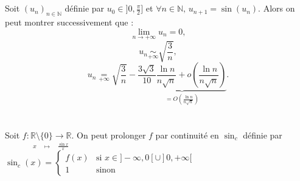 \documentclass[conference]{IEEEtran}
\begin{document}
\section{}
\noindent
Soit $(u_n)_{n\in \mathbb{N}}$ définie par $u_0\in ]0,\frac{\pi}{2}]$ et $\forall n \in \mathbb{N}, \, u_{n+1}=\sin (u_n)$. Alors on peut montrer successivement que : 
\[\lim_{n\rightarrow +\infty} u_n = 0,\]
\[u_n \underset{+\infty}{\sim} \sqrt{\frac{3}{n}},\]
\[u_n \underset{+\infty}{=} \sqrt{\frac{3}{n}}- \underset{= O\left( \frac{\ln n}{n\sqrt{n}} \right)}{\underbrace{\frac{3\sqrt{3}}{10}\frac{\ln n}{n\sqrt{n}}+ o\left( \frac{\ln n}{n\sqrt{n}}\right)}}.\]

\section{}
\noindent
Soit $f: \underset{x \quad \longmapsto \quad \frac{\sin x}{x}}{\mathbb{R} \setminus \{ 0 \} \longrightarrow \mathbb{R}}.$ On peut prolonger $f$ par continuité en $\sin_c$ définie par $\sin_c(x) = \begin{cases}
f(x) & \text{si } x \in ]-\infty,0[\cup]0,+\infty[\\
1 & \text{sinon}
\end{cases}$
\end{document}
